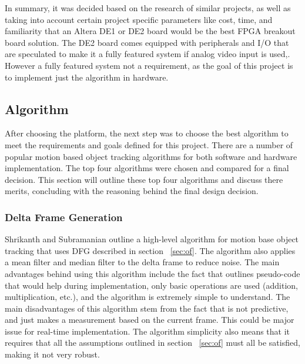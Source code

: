 \documentclass[12pt]{article} %
\begin{document}
In summary, it was decided based on the research of similar projects, as well as taking into account certain project specific parameters like cost, time, and familiarity that an Altera DE1 or DE2 board would be the best FPGA breakout board solution. The DE2 board comes equipped with peripherals and I/O that are speculated to make it a fully featured system if analog video input is used,. However a fully featured system not a requirement, as the goal of this project is to implement just the algorithm in hardware.
\subsection{Algorithm}
After choosing the platform, the next step was to choose the best algorithm to meet the requirements and goals defined for this project. There are a number of popular motion based object tracking algorithms for both software and hardware implementation. The top four algorithms were chosen and compared for a final decision. This section will outline these top four algorithms and discuss there merits, concluding with the reasoning behind the final design decision.
\subsubsection{Delta Frame Generation}
Shrikanth and Subramanian \cite{8} outline a high-level algorithm for motion base object tracking that uses DFG described in section ~\ref{sec:of}. The algorithm also applies a mean filter and median filter to the delta frame to reduce noise. The main advantages behind using this algorithm include the fact that \cite{8} outlines pseudo-code that would help during implementation, only basic operations are used (addition, multiplication, etc.), and the algorithm is extremely simple to understand. The main disadvantages of this algorithm stem from the fact that is not predictive, and just makes a measurement based on the current frame. This could be major issue for real-time implementation. The algorithm simplicity also means that it requires that all the assumptions outlined in section ~\ref{sec:of} must all be satisfied, making it not very robust.
\end{document}
